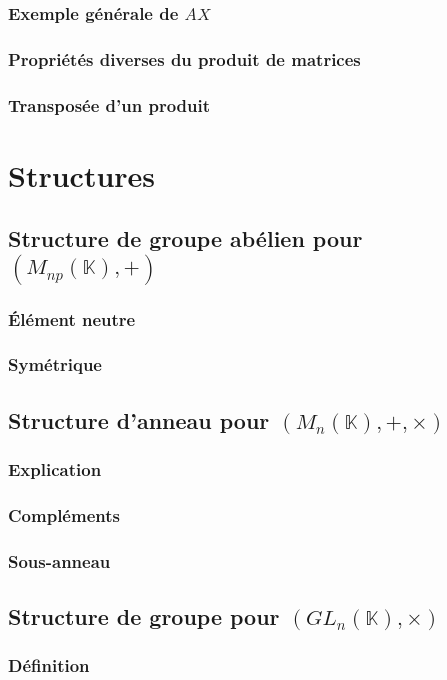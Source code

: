 \documentclass[12pt,a4paper,french]{book}
\begin{document}
			\subsubsection{Exemple générale de $AX$}
			\subsubsection{Propriétés diverses du produit de matrices}
			\subsubsection{Transposée d'un produit}
	\section{Structures}
		\subsection{Structure de groupe abélien pour $(M_{np}(\mathbb{K}),+)$}
			\subsubsection{Élément neutre}
			\subsubsection{Symétrique}
		\subsection{Structure d'anneau pour $(M_{n}(\mathbb{K}),+,\times)$}
			\subsubsection{Explication}
			\subsubsection{Compléments}
			\subsubsection{Sous-anneau}
		\subsection{Structure de groupe pour  $(GL_{n}(\mathbb{K}),\times)$}
			\subsubsection{Définition}
\end{document}
